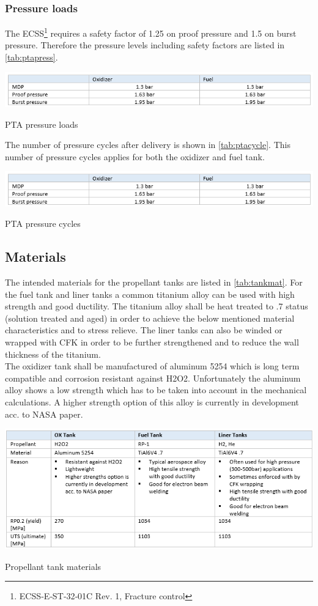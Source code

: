 \subsubsection{Pressure loads}
The ECSS\footnote{ECSS‐E‐ST‐32‐01C Rev. 1, Fracture control} requires a safety factor of 1.25 on proof pressure and 1.5 on burst pressure. Therefore the pressure levels including safety factors are listed in \autoref{tab:ptapress}.
\begin{table}[H]
	\centering
	\includegraphics[width = \linewidth]{ptapress}
	\caption{PTA pressure loads}
	\label{tab:ptapress}
\end{table}{}
The number of pressure cycles after delivery is shown in \autoref{tab:ptacycle}. This number of pressure cycles applies for both the oxidizer and fuel tank.
\begin{table}[H]
	\centering
	\includegraphics[width = 0.6\linewidth]{ptapress}
	\caption{PTA pressure cycles}
	\label{tab:ptacycle}
\end{table}{}
\pagebreak
\subsection{Materials}
The intended materials for the propellant tanks are listed in \autoref{tab:tankmat}. For the fuel tank and liner tanks a common titanium alloy can be used with high strength and good ductility. The titanium alloy shall be heat treated to .7 status (solution treated and aged) in order to achieve the below mentioned material characteristics and to stress relieve. The liner tanks can also be winded or wrapped with CFK in order to be further strengthened and to reduce the wall thickness of the titanium.\\

The oxidizer tank shall be manufactured of aluminum 5254 which is long term compatible and corrosion resistant against H2O2. Unfortunately the aluminum alloy shows a low strength which has to be taken into account in the mechanical calculations. A higher strength option of this alloy is currently in development acc. to NASA paper.
\begin{table}[H]
	\centering
	\includegraphics[width = \linewidth]{tankmat}
	\caption{Propellant tank materials}
	\label{tab:tankmat}
\end{table}{}
\pagebreak
